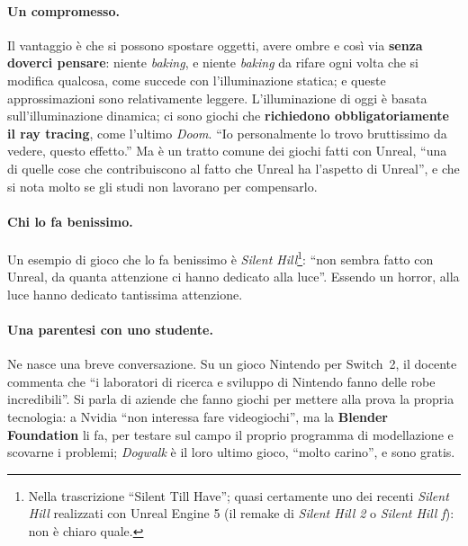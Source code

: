 \paragraph{Un compromesso.} Il vantaggio è che si possono spostare oggetti, avere
ombre e così via \textbf{senza doverci pensare}: niente \emph{baking}, e niente
\emph{baking} da rifare ogni volta che si modifica qualcosa, come succede con
l'illuminazione statica; e queste approssimazioni sono relativamente leggere.
L'illuminazione di oggi è basata sull'illuminazione dinamica; ci sono giochi che
\textbf{richiedono obbligatoriamente il ray tracing}, come l'ultimo \emph{Doom}.
``Io personalmente lo trovo bruttissimo da vedere, questo effetto.'' Ma è un tratto
comune dei giochi fatti con Unreal, ``una di quelle cose che contribuiscono al fatto
che Unreal ha l'aspetto di Unreal'', e che si nota molto se gli studi non lavorano
per compensarlo.

\paragraph{Chi lo fa benissimo.} Un esempio di gioco che lo fa benissimo è
\emph{Silent Hill}\footnote{Nella trascrizione ``Silent Till Have''; quasi certamente
uno dei recenti \emph{Silent Hill} realizzati con Unreal Engine 5 (il remake di
\emph{Silent Hill 2} o \emph{Silent Hill f}): non è chiaro quale.}: ``non sembra fatto
con Unreal, da quanta attenzione ci hanno dedicato alla luce''. Essendo un horror,
alla luce hanno dedicato tantissima attenzione.

\paragraph{Una parentesi con uno studente.} Ne nasce una breve conversazione. Su un
gioco Nintendo per Switch~2, il docente commenta che ``i laboratori di ricerca e
sviluppo di Nintendo fanno delle robe incredibili''. Si parla di aziende che fanno
giochi per mettere alla prova la propria tecnologia: a Nvidia ``non interessa fare
videogiochi'', ma la \textbf{Blender Foundation} li fa, per testare sul campo il
proprio programma di modellazione e scovarne i problemi; \emph{Dogwalk} è il loro
ultimo gioco, ``molto carino'', e sono gratis.

